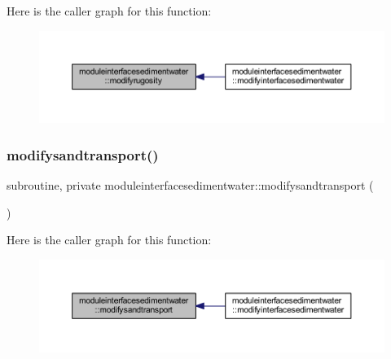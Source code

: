 Here is the caller graph for this function\+:\nopagebreak
\begin{figure}[H]
\begin{center}
\leavevmode
\includegraphics[width=350pt]{namespacemoduleinterfacesedimentwater_aabfaa7472b679988fdb0647b38a7b879_icgraph}
\end{center}
\end{figure}
\mbox{\label{namespacemoduleinterfacesedimentwater_acec4b1c4e1750f68a29c778c4dff4dad}} 
\subsubsection{\texorpdfstring{modifysandtransport()}{modifysandtransport()}}
{\footnotesize\ttfamily subroutine, private moduleinterfacesedimentwater\+::modifysandtransport (\begin{DoxyParamCaption}{ }\end{DoxyParamCaption})\hspace{0.3cm}{\ttfamily [private]}}

Here is the caller graph for this function\+:\nopagebreak
\begin{figure}[H]
\begin{center}
\leavevmode
\includegraphics[width=350pt]{namespacemoduleinterfacesedimentwater_acec4b1c4e1750f68a29c778c4dff4dad_icgraph}
\end{center}
\end{figure}
\mbox{\label{namespacemoduleinterfacesedimentwater_aa69ad0cf59fc330de29ad9983648c806}} 
